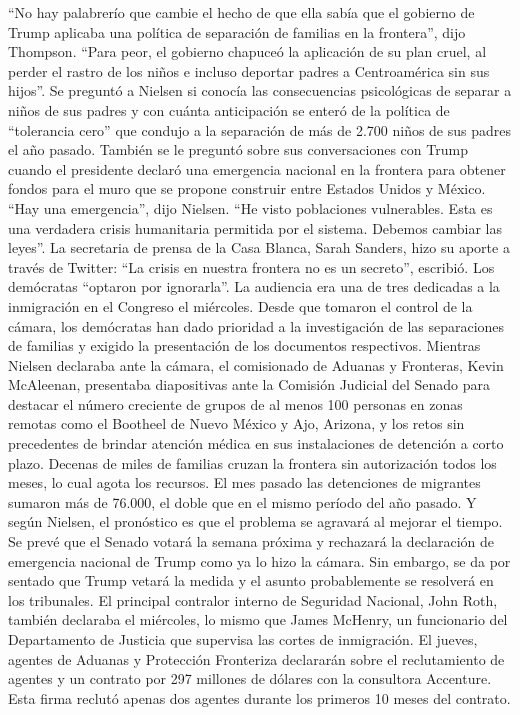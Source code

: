 \documentclass{article}%
\begin{document}
%
“No hay palabrerío que cambie el hecho de que ella sabía que el gobierno de Trump aplicaba una política de separación de familias en la frontera”, dijo Thompson. “Para peor, el gobierno chapuceó la aplicación de su plan cruel, al perder el rastro de los niños e incluso deportar padres a Centroamérica sin sus hijos”.%
\newline%
%
Se preguntó a Nielsen si conocía las consecuencias psicológicas de separar a niños de sus padres y con cuánta anticipación se enteró de la política de “tolerancia cero” que condujo a la separación de más de 2.700 niños de sus padres el año pasado. También se le preguntó sobre sus conversaciones con Trump cuando el presidente declaró una emergencia nacional en la frontera para obtener fondos para el muro que se propone construir entre Estados Unidos y México.%
\newline%
%
“Hay una emergencia”, dijo Nielsen. “He visto poblaciones vulnerables. Esta es una verdadera crisis humanitaria permitida por el sistema. Debemos cambiar las leyes”.%
\newline%
%
La secretaria de prensa de la Casa Blanca, Sarah Sanders, hizo su aporte a través de Twitter: “La crisis en nuestra frontera no es un secreto”, escribió. Los demócratas “optaron por ignorarla”.%
\newline%
%
La audiencia era una de tres dedicadas a la inmigración en el Congreso el miércoles. Desde que tomaron el control de la cámara, los demócratas han dado prioridad a la investigación de las separaciones de familias y exigido la presentación de los documentos respectivos.%
\newline%
%
Mientras Nielsen declaraba ante la cámara, el comisionado de Aduanas y Fronteras, Kevin McAleenan, presentaba diapositivas ante la Comisión Judicial del Senado para destacar el número creciente de grupos de al menos 100 personas en zonas remotas como el Bootheel de Nuevo México y Ajo, Arizona, y los retos sin precedentes de brindar atención médica en sus instalaciones de detención a corto plazo.%
\newline%
%
Decenas de miles de familias cruzan la frontera sin autorización todos los meses, lo cual agota los recursos. El mes pasado las detenciones de migrantes sumaron más de 76.000, el doble que en el mismo período del año pasado. Y según Nielsen, el pronóstico es que el problema se agravará al mejorar el tiempo.%
\newline%
%
Se prevé que el Senado votará la semana próxima y rechazará la declaración de emergencia nacional de Trump como ya lo hizo la cámara. Sin embargo, se da por sentado que Trump vetará la medida y el asunto probablemente se resolverá en los tribunales.%
\newline%
%
El principal contralor interno de Seguridad Nacional, John Roth, también declaraba el miércoles, lo mismo que James McHenry, un funcionario del Departamento de Justicia que supervisa las cortes de inmigración. El jueves, agentes de Aduanas y Protección Fronteriza declararán sobre el reclutamiento de agentes y un contrato por 297 millones de dólares con la consultora Accenture. Esta firma reclutó apenas dos agentes durante los primeros 10 meses del contrato.%
\newline%
%
\end{document}
